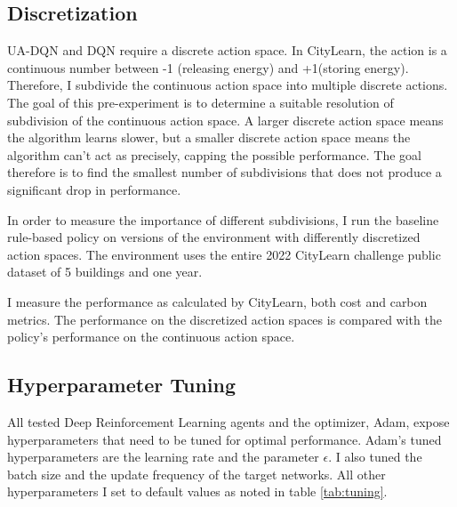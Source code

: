 \subsection{Discretization} \label{sec:discretization}
UA-DQN and DQN require a discrete action space.
In CityLearn, the action is a continuous number between -1 (releasing energy) and +1(storing energy).
Therefore, I subdivide the continuous action space into multiple discrete actions.
The goal of this pre-experiment is to determine a suitable resolution of subdivision of the continuous action space.
A larger discrete action space means the algorithm learns slower, but a smaller discrete action space means the algorithm can't act as precisely, capping the possible performance.
The goal therefore is to find the smallest number of subdivisions that does not produce a significant drop in performance.

In order to measure the importance of different subdivisions, I run the baseline rule-based policy on versions of the environment with differently discretized action spaces.
The environment uses the entire 2022 CityLearn challenge public dataset of 5 buildings and one year.

I measure the performance as calculated by CityLearn, both cost and carbon metrics.
The performance on the discretized action spaces is compared with the policy's performance on the continuous action space.

\subsection{Hyperparameter Tuning}
All tested Deep Reinforcement Learning agents and the optimizer, Adam, expose hyperparameters that need to be tuned for optimal performance.
Adam's tuned hyperparameters are the learning rate and the parameter $\epsilon$. 
I also tuned the batch size and the update frequency of the target networks.
All other hyperparameters I set to default values as noted in table \ref{tab:tuning}.

